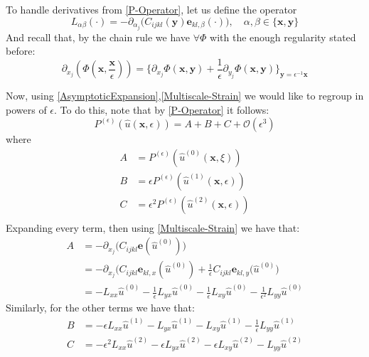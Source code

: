 To handle derivatives from \ref{P-Operator}, let us define the operator 
\begin{equation*}
    L_{\alpha \beta} (\cdot) = - \partial_{\alpha_j} \big( C_{ijkl} (\mathbf{y}) \mathbf{e}_{kl, \beta}(\cdot) \big), \quad \alpha, \beta \in \{ \mathbf{x},\mathbf{y} \}
\end{equation*}
And recall that, by the chain rule we have $\forall \Phi$ with the enough regularity stated before:
\begin{equation*}
    \partial_{x_j} (\Phi (\mathbf{x}, \frac{\mathbf{x}}{\epsilon})) = \big \{ \partial_{x_j} \Phi (\mathbf{x}, \mathbf{y}) + \frac{1}{\epsilon} \partial_{y_j} \Phi(\mathbf{x},\mathbf{y}) \big \}_{\mathbf{y}= \epsilon^{-1}\mathbf{x}}
\end{equation*}

Now, using \ref{AsymptoticExpansion},\ref{Multiscale-Strain} we would like to regroup in powers of $\epsilon$. To do this, note that by \ref{P-Operator} it follows:
\begin{equation*}
    P^{(\epsilon)}(\hat{u}(\mathbf{x},\epsilon)) = A + B + C + \mathcal{O}(\epsilon^3)
\end{equation*}
where 
\begin{equation*}
    \begin{array}{cc}
        A &= P^{(\epsilon)}(\hat{u}^{(0)}(\mathbf{x},\xi)) \\
        B &= \epsilon P^{(\epsilon)}(\hat{u}^{(1)}(\mathbf{x},\epsilon)) \\
        C &= \epsilon^2 P^{(\epsilon)}(\hat{u}^{(2)}(\mathbf{x},\epsilon)) \\
    \end{array}
\end{equation*}
Expanding every term, then using \ref{Multiscale-Strain} we have that:
\begin{align*}
    A &= - \partial_{x_j} \big( C_{ijkl}\mathbf{e}(\hat{u}^{(0)}) \big) \\
    &=- \partial_{x_j} \big( C_{ijkl} \mathbf{e}_{kl,x} (\hat{u}^{(0)}) + \frac{1}{\epsilon}C_{ijkl}\mathbf{e}_{kl,y}(\hat{u}^{(0)} \big)\\
    &= - L_{xx}\hat{u}^{(0)} - \frac{1}{\epsilon} L_{yx}\hat{u}^{(0)} - \frac{1}{\epsilon} L_{xy}\hat{u}^{(0)} - \frac{1}{\epsilon^2}L_{yy}\hat{u}^{(0)}
\end{align*}
Similarly, for the other terms we have that:
\begin{align*}
    B &= -\epsilon L_{xx} \hat{u}^{(1)} - L_{yx}\hat{u}^{(1)} - L_{xy} \hat{u}^{(1)} - \frac{1}{\epsilon} L_{yy}\hat{u}^{(1)} \\
    C &= -\epsilon^2 L_{xx} \hat{u}^{(2)} - \epsilon L_{yx}\hat{u}^{(2)} - \epsilon L_{xy} \hat{u}^{(2)} - L_{yy}\hat{u}^{(2)} 
\end{align*}
